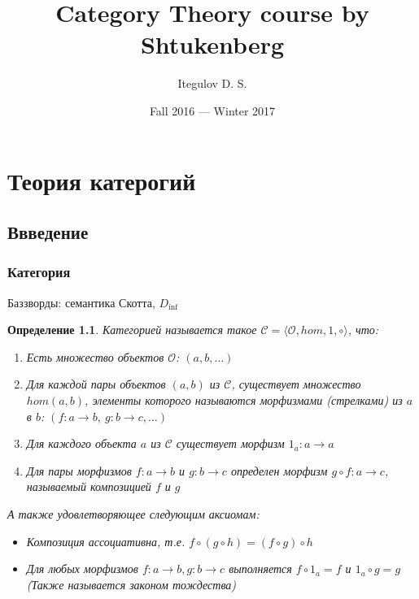 \documentclass[a4paper, fleqn, draft]{report}
\author{Itegulov D. S.}
\title{Category Theory course by Shtukenberg}
\date{Fall 2016 --- Winter 2017}
\newtheorem*{defn}{Определение}
\begin{document}
\maketitle
\tableofcontents
\newpage
\chapter{Теория катерогий}
\section{Ввведение}
\subsection{Категория}
Баззворды: семантика Скотта, $D_{\inf}$
\begin{defn}
  Категорией называется такое
  $\mathcal{C} = \langle \mathcal{O}, hom, 1, \circ \rangle$, что:
  \begin{enumerate}
  \item Есть множество объектов $\mathcal{O}$: $(a, b, \ldots)$
  \item Для каждой пары объектов $(a, b)$ из $\mathcal{C}$, существует множество
    $hom(a, b)$, элементы которого называются морфизмами (стрелками) из $a$ в $b$:
    $(f \colon a \to b,\ g \colon b \to c, \ldots)$
  \item Для каждого объекта $a$ из $\mathcal{C}$ существует морфизм
    $1_a \colon a \to a$
  \item Для пары морфизмов $f \colon a \to b$ и $g \colon b \to c$
    определен морфизм $g \circ f \colon a \to c$, называемый композицией $f$ и $g$
  \end{enumerate}
  А также удовлетворяющее следующим аксиомам:
  \begin{itemize}
  \item Композиция ассоциативна, т.е. $f \circ (g \circ h) = (f \circ g) \circ h$
  \item Для любых морфизмов $f \colon a \to b, g \colon b \to c$ выполняется
    $f \circ 1_a = f$ и $1_a \circ g = g$ (Также называется законом тождества)
  \end{itemize}
\end{defn}
\end{document}
